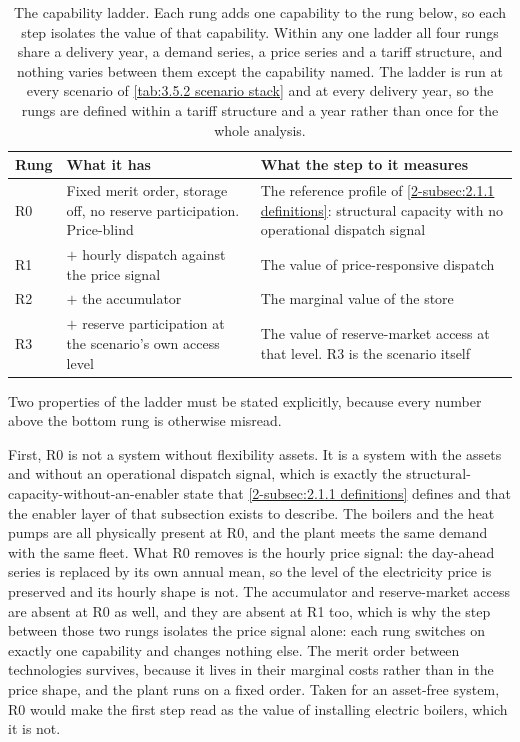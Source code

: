 \begin{table}[h]
\centering
\caption{The capability ladder. Each rung adds one capability to the rung below, so each step isolates the value of that capability. Within any one ladder all four rungs share a delivery year, a demand series, a price series and a tariff structure, and nothing varies between them except the capability named. The ladder is run at every scenario of \autoref{tab:3.5.2 scenario stack} and at every delivery year, so the rungs are defined within a tariff structure and a year rather than once for the whole analysis.}
\small
\begin{tabular}{p{1.2cm} p{5.6cm} p{7.4cm}}
\toprule
\textbf{Rung} & \textbf{What it has} & \textbf{What the step to it measures} \\
\midrule
R0 & Fixed merit order, storage off, no reserve participation. Price-blind & The reference profile of \autoref{2-subsec:2.1.1 definitions}: structural capacity with no operational dispatch signal \\
R1 & $+$ hourly dispatch against the price signal & The value of price-responsive dispatch \\
R2 & $+$ the accumulator & The marginal value of the store \\
R3 & $+$ reserve participation at the scenario's own access level & The value of reserve-market access at that level. R3 is the scenario itself \\
\bottomrule
\end{tabular}
\label{tab:3.5.1 ladder}
\end{table}

Two properties of the ladder must be stated explicitly, because every number above the bottom rung is otherwise misread.

First, R0 is not a system without flexibility assets. It is a system with the assets and without an operational dispatch signal, which is exactly the structural-capacity-without-an-enabler state that \autoref{2-subsec:2.1.1 definitions} defines and that the enabler layer of that subsection exists to describe. The boilers and the heat pumps are all physically present at R0, and the plant meets the same demand with the same fleet. What R0 removes is the hourly price signal: the day-ahead series is replaced by its own annual mean, so the level of the electricity price is preserved and its hourly shape is not. The accumulator and reserve-market access are absent at R0 as well, and they are absent at R1 too, which is why the step between those two rungs isolates the price signal alone: each rung switches on exactly one capability and changes nothing else. The merit order between technologies survives, because it lives in their marginal costs rather than in the price shape, and the plant runs on a fixed order. Taken for an asset-free system, R0 would make the first step read as the value of installing electric boilers, which it is not.

